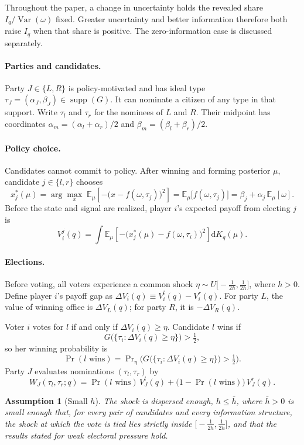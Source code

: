 \documentclass[12pt,letterpaper]{article}
\newtheorem{assumption}{Assumption}
\begin{document}
Throughout the paper, a change in uncertainty holds the revealed share $I_q/\operatorname{Var}(\omega)$ fixed. Greater uncertainty and better information therefore both raise $I_q$ when that share is positive. The zero-information case is discussed separately.

\paragraph{Parties and candidates.}
Party $J\in\{L,R\}$ is policy-motivated and has ideal type $\tau_J=(\alpha_J,\beta_J)\in\operatorname{supp}(G)$. It can nominate a citizen of any type in that support. Write $\tau_l$ and $\tau_r$ for the nominees of $L$ and $R$. Their midpoint has coordinates $\alpha_m=(\alpha_l+\alpha_r)/2$ and $\beta_m=(\beta_l+\beta_r)/2$.

\paragraph{Policy choice.}
Candidates cannot commit to policy. After winning and forming posterior $\mu$, candidate $j\in\{l,r\}$ chooses
\[
x^*_j(\mu)=\arg\max_{x}\;\mathbb{E}_\mu\!\left[-\big(x-f(\omega,\tau_j)\big)^2\right]=\mathbb{E}_\mu\big[f(\omega,\tau_j)\big]=\beta_j+\alpha_j\,\mathbb{E}_\mu[\omega].
\]
Before the state and signal are realized, player $i$'s expected payoff from electing $j$ is
\[
V_i^j(q)=\int \mathbb{E}_\mu\!\left[-\big(x^*_j(\mu)-f(\omega,\tau_i)\big)^2\right]\mathrm{d}K_q(\mu).
\]

\paragraph{Elections.}
Before voting, all voters experience a common shock $\eta\sim U\big[-\tfrac{1}{2h},\tfrac{1}{2h}\big]$, where $h>0$. Define player $i$'s payoff gap as $\Delta V_i(q)\equiv V_i^l(q)-V_i^r(q)$. For party $L$, the value of winning office is $\Delta V_L(q)$; for party $R$, it is $-\Delta V_R(q)$.

Voter $i$ votes for $l$ if and only if $\Delta V_i(q)\ge\eta$. Candidate $l$ wins if
\[
G\big(\{\tau_i:\Delta V_i(q)\ge\eta\}\big)>\tfrac12 ,
\]
so her winning probability is
\[
\Pr(l\text{ wins})=\Pr\nolimits_\eta\Big(G\big(\{\tau_i:\Delta V_i(q)\ge\eta\}\big)>\tfrac12\Big).
\]
Party $J$ evaluates nominations $(\tau_l,\tau_r)$ by
\[
W_J(\tau_l,\tau_r;q)=\Pr(l\text{ wins})\,V_J^l(q)+\big(1-\Pr(l\text{ wins})\big)\,V_J^r(q).
\]

\begin{assumption}[Small $h$]\label{ass:small-h}
The shock is dispersed enough, $h\le\bar h$, where $\bar h>0$ is small enough that, for every pair of candidates and every information structure, the shock at which the vote is tied lies strictly inside $\big[-\tfrac{1}{2h},\tfrac{1}{2h}\big]$, and that the results stated for weak electoral pressure hold.
\end{assumption}
\end{document}
